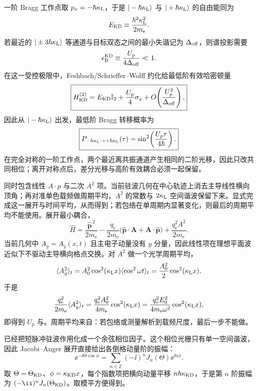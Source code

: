 \begin{exbox}
一阶 Bragg 工作点取 $p_x=-\hbar\kappa_{\rm L}$，于是 $|-\hbar\kappa_{\rm L}\rangle$ 与 $|+\hbar\kappa_{\rm L}\rangle$ 的自由能同为
\[
E_{\rm KD}\equiv\frac{\hbar^2\kappa_{\rm L}^2}{2m_{\mathrm e}}.
\]
若最近的 $|\pm3\hbar\kappa_{\rm L}\rangle$ 等通道与目标双态之间的最小失谐记为 $\Delta_{\rm off}$，则谱投影需要
\[
\epsilon_{\rm B}^{\rm KD}\equiv\frac{U_p}{4\Delta_{\rm off}}\ll1.
\]
在这一受控极限中，Feshbach/Schrieffer--Wolff 约化给最低阶有效哈密顿量
\begin{equation}
\boxed{
H_{\rm KD}^{(2)}
=E_{\rm KD}\mathbb I_2+\frac{U_p}{4}\sigma_x
+O\!\left(\frac{U_p^2}{\Delta_{\rm off}}\right),}
\label{eq:kd_bragg_two_level_hamiltonian}
\end{equation}
因此从 $|-\hbar\kappa_{\rm L}\rangle$ 出发，最低阶 Bragg 转移概率为
\begin{equation}
\boxed{
P_{-\hbar\kappa_{\rm L}\rightarrow+\hbar\kappa_{\rm L}}(\tau)
=\sin^2\!\left(\frac{U_p\tau}{4\hbar}\right).}
\label{eq:kd_bragg_rabi_probability}
\end{equation}
在完全对称的一阶工作点，两个最近离共振通道产生相同的二阶光移，因此只改共同相位；离开对称点后，差分光移与高阶有效耦合必须一起保留。

\medskip

 同时包含线性 $A\!\cdot\!p$ 与二次 $A^2$ 项。当前驻波几何在中心轨迹上消去主导线性横向顶角；再对准单色载频做周期平均，$A^2$ 的常数与 $2\kappa_{\rm L}$ 空间谐波保留下来。显式完成这一展开与时间平均，从而得到；若包络在单周期内显著变化，则最后的周期平均不能使用。展开最小耦合，
\[
\hat H=\frac{\hat{\mathbf p}^{\,2}}{2m_{\mathrm e}}
-\frac{q_{\mathrm e}}{2m_{\mathrm e}}\bigl(\hat{\mathbf p}\!\cdot\!\mathbf A+\mathbf A\!\cdot\!\hat{\mathbf p}\bigr)
+\frac{q_{\mathrm e}^2A^2}{2m_{\mathrm e}}.
\]
当前几何中 $A_y=A_y(x,t)$ 且主电子动量没有 $y$ 分量，因此线性项在理想平面波近似下不驱动主导横向格点交换。对 $A^2$ 做一个光学周期平均，
\[
\langle A_y^2\rangle_t
=A_0^2\cos^2(\kappa_{\rm L}x)\langle\cos^2\omega t\rangle_t
=\frac{A_0^2}{2}\cos^2(\kappa_{\rm L}x).
\]
于是
\[
\frac{q_{\mathrm e}^2}{2m_{\mathrm e}}\langle A_y^2\rangle_t
=\frac{q_{\mathrm e}^2A_0^2}{4m_{\mathrm e}}\cos^2(\kappa_{\rm L}x)
=\frac{q_{\mathrm e}^2E_0^2}{4m_{\mathrm e}\omega^2}\cos^2(\kappa_{\rm L}x),
\]
即得到 $U_p$ 与。周期平均来自：若包络或测量解析到载频尺度，最后一步不能做。

\medskip

 已经把短脉冲驻波作用化成一个余弦相位因子。这个相位光栅只有单一空间谐波，因此 Jacobi--Anger 展开直接给出各倒格动量阶的振幅：
\[
\ee^{-\ii\Theta\cos\phi}
=\sum_{n\in\mathbb Z}(-\ii)^nJ_n(\Theta)\ee^{\ii n\phi}.
\]
取 $\Theta=\Theta_{\rm KD}$、$\phi=\kappa_{\rm KD}x$，每个指数项把横向动量平移 $n\hbar\kappa_{\rm KD}$，于是第 $n$ 阶振幅为 $(-\ii)^nJ_n(\Theta_{\rm KD})$。取模平方便得到。


\end{exbox}
